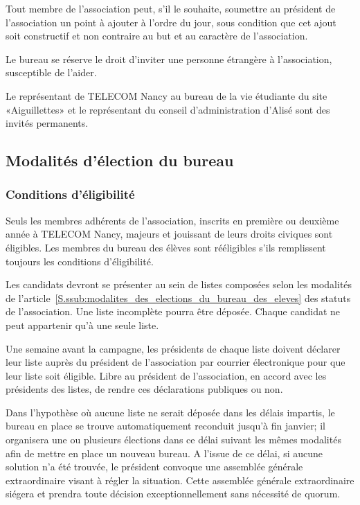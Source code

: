 \documentclass{article} %
\begin{document}
				Tout membre de l’association peut, s’il le souhaite, soumettre
				au président de l’association un point à ajouter à l’ordre du
				jour, sous condition que cet ajout soit constructif et non
				contraire au but et au caractère de l’association.

				Le bureau se réserve le droit d’inviter une personne étrangère à
				l’association, susceptible de l’aider. 

				Le représentant de TELECOM Nancy au bureau de la vie étudiante
				du site «Aiguillettes» et le représentant du conseil
				d’administration d’Alisé sont des invités permanents.

		\subsection{Modalités d'élection du bureau}
\label{sub:modalites_d_election_du_bureau}

			\subsubsection{Conditions d'éligibilité}
\label{ssub:conditions_d_eligibilite}

				Seuls les membres adhérents de l'association, inscrits en
				première ou deuxième année à TELECOM Nancy, majeurs et jouissant
				de leurs droits civiques sont éligibles. Les membres du bureau
				des élèves sont rééligibles s’ils remplissent toujours les
				conditions d’éligibilité.

				Les candidats devront se présenter au sein de listes composées
				selon les modalités de
				l’article~\ref{S.ssub:modalites_des_elections_du_bureau_des_eleves}
				des statuts de l’association. Une liste incomplète pourra être
				déposée. Chaque candidat ne peut appartenir qu’à une seule
				liste.

				Une semaine avant la campagne, les présidents de chaque liste
				doivent déclarer leur liste auprès du président de l’association
				par courrier électronique pour que leur liste soit éligible.
				Libre au président de l’association, en accord avec les
				présidents des listes, de rendre ces déclarations publiques ou
				non.

				Dans l’hypothèse où aucune liste ne serait déposée dans les
				délais impartis, le bureau en place se trouve automatiquement
				reconduit jusqu’à fin janvier; il organisera une ou plusieurs
				élections dans ce délai suivant les mêmes modalités afin de
				mettre en place un nouveau bureau. A l’issue de ce délai, si
				aucune solution n’a été trouvée, le président convoque une
				assemblée générale extraordinaire visant à régler la situation.
				Cette assemblée générale extraordinaire siégera et prendra toute
				décision exceptionnellement sans nécessité de quorum.
\end{document}
